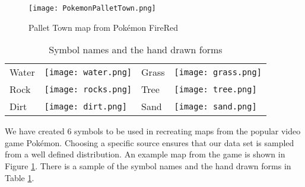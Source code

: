 \begin{figure}[h]
\begin{center}
\texttt{[image: PokemonPalletTown.png]}
\end{center}
\caption{Pallet Town map from Pok\'{e}mon FireRed \cite{firered}}
\label{fig:pokemon}
\end{figure}

\begin{table}
\label{table:symbols}
\caption{Symbol names and the hand drawn forms}
\begin{center}
\begin{tabular}{llll}
Water & \texttt{[image: water.png]} &
Grass & \texttt{[image: grass.png]} \\
Rock & \texttt{[image: rocks.png]} &
Tree & \texttt{[image: tree.png]} \\
Dirt & \texttt{[image: dirt.png]} &
Sand & \texttt{[image: sand.png]} \\
\end{tabular}
\end{center}
\end{table}

We have created 6 symbols to be used in recreating maps from the popular video
game Pok\'{e}mon. Choosing a specific source ensures that our data set is
sampled from a well defined distribution.  An example map from the game is
shown in Figure \ref{fig:pokemon}. There is a sample of the symbol names and
the hand drawn forms in Table \ref{table:symbols}.


